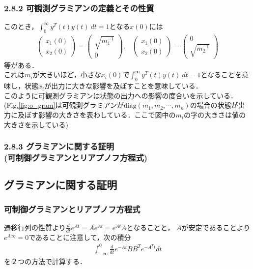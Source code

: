 \begin{frame}[t]
\frametitle{2.8.2 可観測グラミアンの定義とその性質}
このとき，$\int_{0}^{\infty} y^T(t) y(t) \ dt =1$となる$x(0)$には
\begin{align}
	\left(\begin{array}{c}
         x_1(0)\\
	 x_2(0) 
	\end{array}\right)
	= 
	\left(\begin{array}{c}
         \sqrt{m_1^{-1}}\\
	 0 
	\end{array}\right)
	, \ \ \ \ 
	\left(\begin{array}{c}
         x_1(0)\\
	 x_2(0) 
	\end{array}\right)
	= 
	\left(\begin{array}{c}
         0\\
	 \sqrt{m_2^{-1}} 
	\end{array}\right)
\end{align}
等がある．
\\[3mm]

これは$m_i$が大きいほど，小さな$x_i(0)$で$\int_{0}^{\infty} y^T(t) y(t) \ dt =1$となることを意味し，状態$x_i$が出力に大きな影響を及ぼすことを意味している．
\\[3mm]

このように可観測グラミアンは状態の出力への影響の度合いを示している．
(Fig,\ref{fig:o_gram}は可観測グラミアンが$\mbox{diag}(m_1, m_2, \cdots, m_n)$の場合の状態が出力に及ぼす影響の大きさを表わしている．ここで図中の$m_i$の字の大きさは値の大きさを示している)


\end{frame}

\begin{frame}[t]
\frametitle{2.8.3 グラミアンに関する証明\\ (可制御グラミアンとリアプノフ方程式)}
\subsection{グラミアンに関する証明}

\subsubsection{可制御グラミアンとリアプノフ方程式}

遷移行列の性質より$\frac{d}{dt} e^{At} = A e^{At} = e^{At} A$となることと，
$A$が安定であることより$e^{A \infty}=0$であることに注意して，次の積分
\begin{align}
	\int_{-\infty}^{0} \frac{d}{dt}e^{-At} B B^T e^{-A^T t} d t
\end{align}
を２つの方法で計算する．
\end{frame}

